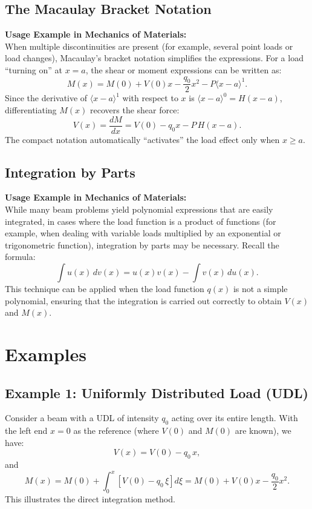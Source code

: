 \documentclass[12pt]{article}
\begin{document}
\subsection{The Macaulay Bracket Notation}
\textbf{Usage Example in Mechanics of Materials:} \\
When multiple discontinuities are present (for example, several point loads or load changes), Macaulay’s bracket notation simplifies the expressions. For a load “turning on” at $x=a$, the shear or moment expressions can be written as:
\[
M(x) = M(0) + V(0)x - \frac{q_0}{2}x^2 - P\langle x - a \rangle^1.
\]
Since the derivative of $\langle x - a \rangle^1$ with respect to $x$ is $\langle x - a \rangle^0 = H(x-a)$, differentiating $M(x)$ recovers the shear force:
\[
V(x) = \frac{dM}{dx} = V(0) - q_0 x - P\,H(x-a).
\]
The compact notation automatically “activates” the load effect only when $x\ge a$.

\subsection{Integration by Parts}
\textbf{Usage Example in Mechanics of Materials:} \\
While many beam problems yield polynomial expressions that are easily integrated, in cases where the load function is a product of functions (for example, when dealing with variable loads multiplied by an exponential or trigonometric function), integration by parts may be necessary. Recall the formula:
\[
\int u(x)\,dv(x) = u(x)v(x) - \int v(x)\,du(x).
\]
This technique can be applied when the load function $q(x)$ is not a simple polynomial, ensuring that the integration is carried out correctly to obtain $V(x)$ and $M(x)$.

\section{Examples}

\subsection{Example 1: Uniformly Distributed Load (UDL)}
Consider a beam with a UDL of intensity $q_0$ acting over its entire length. With the left end $x=0$ as the reference (where $V(0)$ and $M(0)$ are known), we have:
\[
V(x) = V(0) - q_0\, x,
\]
and
\[
M(x) = M(0) + \int_0^x \left[ V(0) - q_0\,\xi \right] d\xi = M(0) + V(0)x - \frac{q_0}{2}x^2.
\]
This illustrates the direct integration method.
\end{document}

